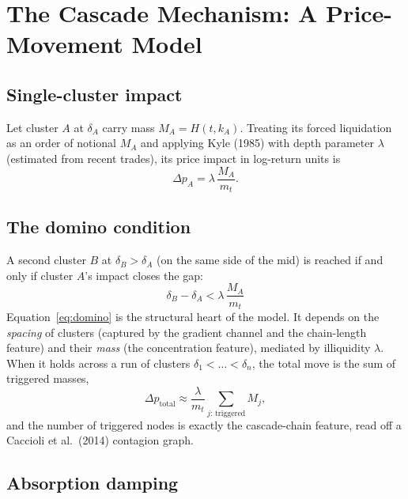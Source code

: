 \documentclass[11pt,a4paper]{article}
\theoremstyle{definition}
\theoremstyle{plain}
\begin{document}
\section{The Cascade Mechanism: A Price-Movement Model}
\label{sec:cascade}

\subsection{Single-cluster impact}

Let cluster $A$ at $\delta_A$ carry mass $M_A = H(t,k_A)$. Treating its forced liquidation as an
order of notional $M_A$ and applying Kyle (1985) with depth parameter $\lambda$ (estimated from
recent trades), its price impact in log-return units is
\begin{equation}
  \Delta p_A = \lambda \,\frac{M_A}{m_t}.
  \label{eq:impact}
\end{equation}

\subsection{The domino condition}

A second cluster $B$ at $\delta_B > \delta_A$ (on the same side of the mid) is reached if and only
if cluster $A$'s impact closes the gap:
\begin{equation}
  \boxed{\;\delta_B - \delta_A < \lambda\,\frac{M_A}{m_t}\;}
  \label{eq:domino}
\end{equation}
Equation~\eqref{eq:domino} is the structural heart of the model. It depends on the \emph{spacing}
of clusters (captured by the gradient channel and the chain-length feature) and their \emph{mass}
(the concentration feature), mediated by illiquidity $\lambda$. When it holds across a run of
clusters $\delta_1 < \dots < \delta_n$, the total move is the sum of triggered masses,
\begin{equation}
  \Delta p_{\text{total}} \approx \frac{\lambda}{m_t} \sum_{j:\,\text{triggered}} M_j,
  \label{eq:total}
\end{equation}
and the number of triggered nodes is exactly the cascade-chain feature, read off a Caccioli
et al.\ (2014) contagion graph.

\subsection{Absorption damping}
\end{document}
